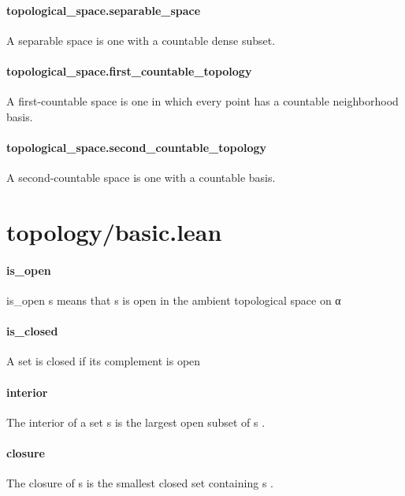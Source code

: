 \documentclass{article}
\begin{document}
\paragraph{topological\_space.separable\_space}
\par
A separable space is one with a countable dense subset.
\paragraph{topological\_space.first\_countable\_topology}
\par
A first-countable space is one in which every point has a
countable neighborhood basis.
\paragraph{topological\_space.second\_countable\_topology}
\par
A second-countable space is one with a countable basis.
\section{topology/basic.lean}\paragraph{is\_open}
\par
\colorbox[RGB]{253,246,227}{{{{\color[RGB]{101, 123, 131} is\_open s }}}} means that 
\colorbox[RGB]{253,246,227}{{{{\color[RGB]{101, 123, 131} s }}}} is open in the ambient topological space on 
\colorbox[RGB]{253,246,227}{{{{\color[RGB]{101, 123, 131} α }}}}\paragraph{is\_closed}
\par
A set is closed if its complement is open
\paragraph{interior}
\par
The interior of a set 
\colorbox[RGB]{253,246,227}{{{{\color[RGB]{101, 123, 131} s }}}} is the largest open subset of 
\colorbox[RGB]{253,246,227}{{{{\color[RGB]{101, 123, 131} s }}}}.
\paragraph{closure}
\par
The closure of 
\colorbox[RGB]{253,246,227}{{{{\color[RGB]{101, 123, 131} s }}}} is the smallest closed set containing 
\colorbox[RGB]{253,246,227}{{{{\color[RGB]{101, 123, 131} s }}}}.
\end{document}
